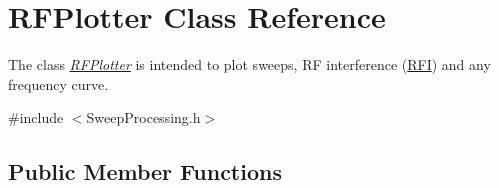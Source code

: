 \hypertarget{classRFPlotter}{}\section{R\+F\+Plotter Class Reference}
\label{classRFPlotter}


The class {\itshape \hyperlink{classRFPlotter}{R\+F\+Plotter}} is intended to plot sweeps, RF interference (\hyperlink{structRFI}{R\+FI}) and any frequency curve.  




{\ttfamily \#include $<$Sweep\+Processing.\+h$>$}

\subsection*{Public Member Functions}
